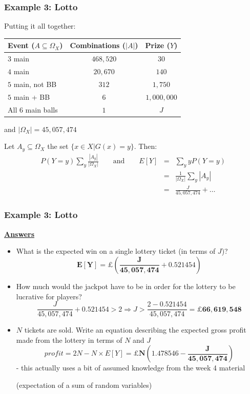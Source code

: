 \documentclass[t,8pt]{beamer}%
\begin{document}
\begin{frame}
\frametitle{Example 3: Lotto}
Putting it all together:
\begin{table}
\centering
\begin{tabular}{|l|c|c|}
    \hline 
    Event ($A\subseteq\Omega_X$) & Combinations ($|A|$) & Prize ($Y$) \\ \hline
    $3$ main & $468,520$ & $30$\\
    $4$ main & $20,670$ & $140$\\
    $5$ main, not BB & $312$ & $1,750$\\
    $5$ main + BB & $6$ & $1,000,000$\\
    All $6$ main balls & $1$ & $J$ \\ \hline
    \end{tabular}
    \end{table}
    and $|\Omega_X|=45,057,474$ \par
Let $A_y\subseteq\Omega_X$ the set $\{x\in X|G(x)=y\}$. Then:
\begin{eqnarray*}
    P(Y=y)\sum_y\frac{|A_y|}{|\Omega_X|}\qquad\text{and}\qquad E[Y]&=&\sum_yyP(Y=y)\\
    &=&\frac 1{|\Omega_X|}\sum_y|A_y|\\
    &=&\frac J{45,057,474}+\dots
\end{eqnarray*}
\end{frame}

\begin{frame}
\frametitle{Example 3: Lotto}
{\bf\underline{Answers}} \par
\begin{itemize}
    \item What is the expected win on a single lottery ticket (in terms of $J$)?
    \color{red}
    $$\mathbf{E[Y]=\pounds\left(\frac J{45,057,474}+0.521454\right)}$$
    \color{black}
    \item How much would the jackpot have to be in order for the lottery to be lucrative for players?
    \color{red}
    $$\frac J{45,057,474}+0.521454>2\Rightarrow J>\frac{2-0.521454}{45,057,474}=\mathbf{\pounds 66,619,548}$$
    \color{black}
    \item $N$ tickets are sold. Write an equation describing the expected gross profit made from the lottery in terms of $N$ and $J$
    \color{red}
    $$profit=2N-N\times E[Y]=\mathbf{\pounds N\left(1.478546-\frac J{45,057,474}\right)}$$
    \color{black}
    - this actually uses a bit of assumed knowledge from the week 4 material \par
    (expectation of a sum of random variables)
\end{itemize}
\end{frame}
\end{document}
